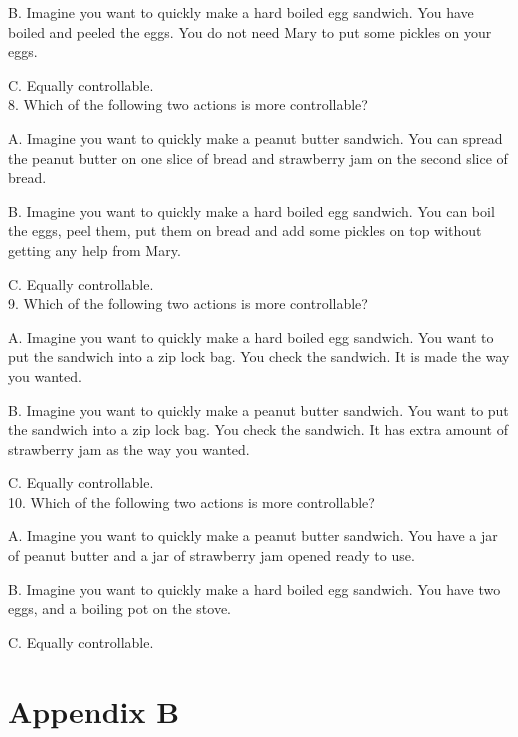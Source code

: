 \documentclass[12pt]{report}
\begin{document}
\begin{appendices}
B. Imagine you want to quickly make a hard boiled egg sandwich. You have boiled and peeled the eggs. You do not need Mary to put some pickles on your eggs.

C. Equally controllable.\\


8. Which of the following two actions is more controllable?

A. Imagine you want to quickly make a peanut butter sandwich. You can spread the peanut butter on one slice of bread and strawberry jam on the second slice of bread.

B. Imagine you want to quickly make a hard boiled egg sandwich. You can boil the eggs, peel them, put them on bread and add some pickles on top without getting any help from Mary.

C. Equally controllable.\\


9. Which of the following two actions is more controllable?

A. Imagine you want to quickly make a hard boiled egg sandwich. You want to put the sandwich into a zip lock bag. You check the sandwich. It is made the way you wanted.

B. Imagine you want to quickly make a peanut butter sandwich. You want to put the sandwich into a zip lock bag. You check the sandwich. It has extra amount of strawberry jam as the way you wanted.

C. Equally controllable.\\


10. Which of the following two actions is more controllable?

A. Imagine you want to quickly make a peanut butter sandwich. You have a jar of peanut butter and a jar of strawberry jam opened ready to use.

B. Imagine you want to quickly make a hard boiled egg sandwich. You have two eggs, and a boiling pot on the stove.

C. Equally controllable.\\


\chapter*{Appendix B}
\label{apdx:end-to-end-user-study}


\end{appendices}
\end{document}
